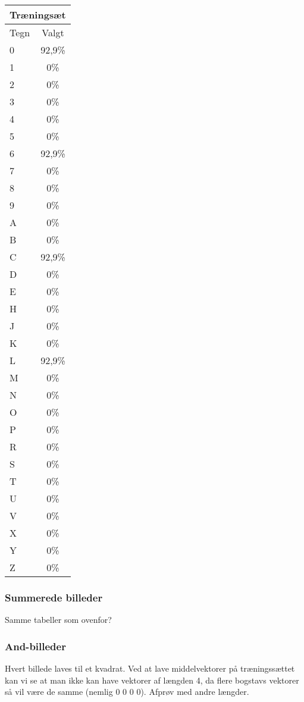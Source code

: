 \begin{tabular}{|l|c|}\hline
\multicolumn{2}{|l|}{Træningsæt} \\\hline
Tegn & Valgt \\\hline
0 & 92,9\% \\\hline
1 & 0\% \\\hline
2 & 0\% \\\hline
3 & 0\% \\\hline
4 & 0\% \\\hline
5 & 0\% \\\hline
6 & 92,9\% \\\hline
7 & 0\% \\\hline
8 & 0\% \\\hline
9 & 0\% \\\hline
A & 0\% \\\hline
B & 0\% \\\hline
C & 92,9\% \\\hline
D & 0\% \\\hline
E & 0\% \\\hline
H & 0\% \\\hline
J & 0\% \\\hline
K & 0\% \\\hline 
L & 92,9\% \\\hline
M & 0\% \\\hline
N & 0\% \\\hline
O & 0\% \\\hline
P & 0\% \\\hline
R & 0\% \\\hline
S & 0\% \\\hline
T & 0\% \\\hline
U & 0\% \\\hline
V & 0\% \\\hline
X & 0\% \\\hline
Y & 0\% \\\hline
Z & 0\% \\\hline \end{tabular}



\subsubsection{Summerede billeder}
Samme tabeller som ovenfor?

\subsubsection{And-billeder}
Hvert billede laves til et kvadrat. Ved at lave middelvektorer på træningssættet kan vi se at man ikke kan have vektorer af længden 4, da flere bogstavs vektorer så vil være de samme (nemlig 0 0 0 0). Afprøv med andre længder.


